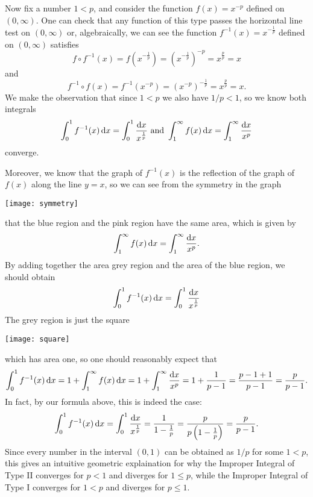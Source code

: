 \documentclass[reqno, 12pt]{amsart}
\begin{document}
  Now fix a number \(1 < p\), and consider the function \(f(x) = x^{-p}\) defined on \((0,\infty)\).
  One can check that any function of this type passes the horizontal line test on \((0, \infty)\) or, algebraically, we can see the function \(f^{-1}(x) = x^{-\frac{1}{p}}\) defined on \((0,\infty)\) satisfies
    \[f \circ f^{-1}(x) = f\left(x^{-\frac{1}{p}}\right) = \left(x^{-\frac{1}{p}}\right)^{-p} = x^\frac{p}{p} = x\]
  and
  \[f^{-1} \circ f(x) = f^{-1}\left(x^{-p}\right) = \left(x^{-p}\right)^{-\frac{1}{p}} = x^\frac{p}{p} = x.\]
  We make the observation that since \(1 < p\) we also have \(1/p < 1\), so we know both integrals
  \[\int_0^1 f^{-1}(x) \dif x = \int_0^1 \frac{\dif x}{x^\frac{1}{p}}\
  \text{and}\
  \int_1^\infty f(x) \dif x = \int_1^\infty \frac{\dif x}{x^p}\]
  converge.

  Moreover, we know that the graph of \(f^{-1}(x)\) is the reflection of the graph of \(f(x)\) along the line \(y = x\), so we can see from the symmetry in the graph
  \begin{center}
    \texttt{[image: symmetry]}
  \end{center}
  that the blue region and the pink region have the same area, which is given by
  \[\int_1^\infty f(x)\dif x = \int_1^\infty \frac{\dif x}{x^p}.\]
  By adding together the area grey region and the area of the blue region, we should obtain 
  \[\int_0^1 f^{-1}(x) \dif x = \int_0^1 \frac{\dif x}{x^\frac{1}{p}}\]
  The grey region is just the square
  \begin{center}
    \texttt{[image: square]}
  \end{center}
  which has area one, so one should reasonably expect that
  \[\int_0^1 f^{-1}(x)\dif x = 1 + \int_1^\infty f(x)\dif x = 1 + \int_1^\infty \frac{\dif x}{x^p} = 1 + \frac{1}{p - 1} = \frac{p - 1 + 1}{p - 1} = \frac{p}{p - 1}.\]
  In fact, by our formula above, this is indeed the case:
  \[\int_0^1 f^{-1}(x)\dif x = \int_0^1 \frac{\dif x}{x^\frac{1}{p}} = \frac{1}{1 - \frac{1}{p}} = \frac{p}{p\left(1 - \frac{1}{p}\right)} = \frac{p}{p - 1}.\]
  Since every number in the interval \((0,1)\) can be obtained as \(1/p\) for some \(1 < p\), this gives an intuitive geometric explaination for why the Improper Integral of Type II
  converges for \(p < 1\) and diverges for \(1 \leq p\), while the Improper Integral of Type I
  converges for \(1 < p\) and diverges for \(p \leq 1\).
\end{document}
